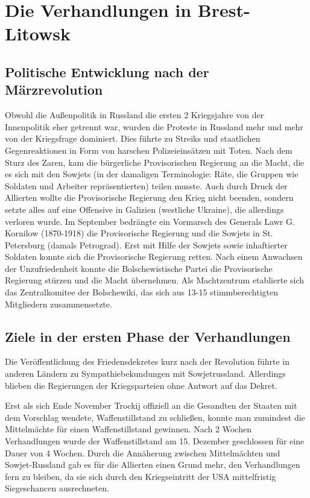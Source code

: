 \documentclass[12pt,headsepline,a4paper]{scrartcl}
\begin{document}
\newpage
\section{Die Verhandlungen in Brest-Litowsk}

\subsection{Politische Entwicklung nach der Märzrevolution}
Obwohl die Außenpolitik in Russland die ersten 2 Kriegsjahre von der Innenpolitik eher getrennt war, wurden die Proteste in Russland mehr und mehr von der Kriegsfrage dominiert. Dies führte zu Streiks und staatlichen Gegenreaktionen in Form von harschen Polizeieinsätzen mit Toten. Nach dem Sturz des Zaren, kam  die bürgerliche Provisorischen Regierung an die Macht, die es sich mit den Sowjets (in der damaligen Terminologie: Räte, die Gruppen wie Soldaten und Arbeiter  repräsentierten) teilen musste. Auch durch Druck der Allierten wollte die Provisorische Regierung den Krieg nicht beenden, sondern setzte alles auf eine Offensive in Galizien (westliche Ukraine), die allerdings verloren wurde. Im September bedrängte ein Vormarsch des Generals Lawr G. Kornilow (1870-1918) die Provisorische Regierung und die Sowjets in St. Petersburg (damals Petrograd). Erst mit Hilfe der Sowjets sowie inhaftierter Soldaten konnte sich die Provisorische Regierung retten. Nach einem Anwachsen der Unzufriedenheit konnte die Bolschewistische Partei die Provisorische Regierung stürzen und die Macht übernehmen. Als Machtzentrum etablierte sich das Zentralkomitee der Bolschewiki, das sich aus 13-15 stimmberechtigten Mitgliedern zusammensetzte.

\subsection{Ziele in der ersten Phase der Verhandlungen}
Die Veröffentlichung des Friedensdekretes kurz nach der Revolution führte in anderen Ländern zu Sympathiebekundungen mit Sowjetrussland. Allerdings blieben die Regierungen der Kriegsparteien  ohne Antwort auf das Dekret. 

Erst als sich Ende November Trockij offiziell an die Gesandten der Staaten mit dem Vorschlag wendete, Waffenstillstand zu schließen, konnte man zumindest die Mittelmächte für einen Waffenstillstand gewinnen. Nach 2 Wochen Verhandlungen wurde der Waffenstillstand am 15. Dezember geschlossen für eine Dauer von 4 Wochen. Durch die Annäherung zwischen Mittelmächten und Sowjet-Russland gab es für die Allierten einen Grund mehr, den Verhandlungen fern zu bleiben, da sie sich durch den Kriegseintritt der USA mittelfristig Siegeschancen ausrechneten.
\end{document}
